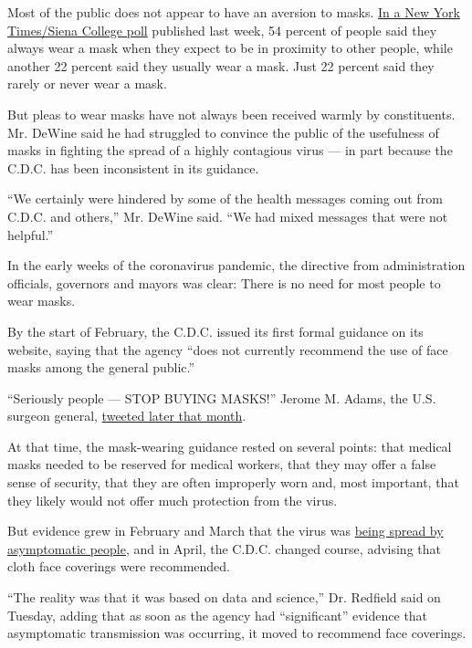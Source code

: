 Most of the public does not appear to have an aversion to masks.
\href{https://www.nytimes.com/2020/06/24/us/politics/trump-biden-poll-nyt-upshot-siena-college.html}{In
a New York Times/Siena College poll} published last week, 54 percent of
people said they always wear a mask when they expect to be in proximity
to other people, while another 22 percent said they usually wear a mask.
Just 22 percent said they rarely or never wear a mask.

But pleas to wear masks have not always been received warmly by
constituents. Mr. DeWine said he had struggled to convince the public of
the usefulness of masks in fighting the spread of a highly contagious
virus --- in part because the C.D.C. has been inconsistent in its
guidance.

``We certainly were hindered by some of the health messages coming out
from C.D.C. and others,'' Mr. DeWine said. ``We had mixed messages that
were not helpful.''

In the early weeks of the coronavirus pandemic, the directive from
administration officials, governors and mayors was clear: There is no
need for most people to wear masks.

By the start of February, the C.D.C. issued its first formal guidance on
its website, saying that the agency ``does not currently recommend the
use of face masks among the general public.''

``Seriously people --- STOP BUYING MASKS!'' Jerome M. Adams, the U.S.
surgeon general,
\href{https://twitter.com/Surgeon_General/status/1233725785283932160?s=20}{tweeted
later that month}.

At that time, the mask-wearing guidance rested on several points: that
medical masks needed to be reserved for medical workers, that they may
offer a false sense of security, that they are often improperly worn
and, most important, that they likely would not offer much protection
from the virus.

But evidence grew in February and March that the virus was
\href{https://www.nytimes.com/2020/02/04/health/coronavirus-symptoms-germany.html}{being
spread by asymptomatic people}, and in April, the C.D.C. changed course,
advising that cloth face coverings were recommended.

``The reality was that it was based on data and science,'' Dr. Redfield
said on Tuesday, adding that as soon as the agency had ``significant''
evidence that asymptomatic transmission was occurring, it moved to
recommend face coverings.

